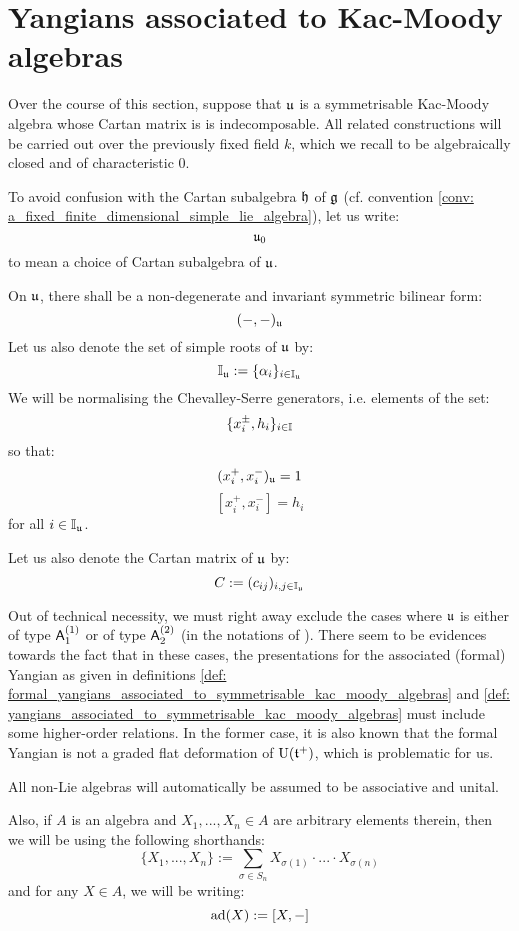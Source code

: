 \section{Yangians associated to Kac-Moody algebras}
    \begin{convention} \label{conv: a_fixed_symmetrisable_kac_moody_algebra}
        Over the course of this section, suppose that $\mathfrak{u}$ is a symmetrisable Kac-Moody algebra whose Cartan matrix is is indecomposable. All related constructions will be carried out over the previously fixed field $k$, which we recall to be algebraically closed and of characteristic $0$. 

        To avoid confusion with the Cartan subalgebra $\mathfrak{h}$ of $\mathfrak{g}$ (cf. convention \ref{conv: a_fixed_finite_dimensional_simple_lie_algebra}), let us write:
            $$\mathfrak{u}_0$$
        to mean a choice of Cartan subalgebra of $\mathfrak{u}$. 
        
        On $\mathfrak{u}$, there shall be a non-degenerate and invariant symmetric bilinear form:
            $$(-, -)_{\mathfrak{u}}$$
        Let us also denote the set of simple roots of $\mathfrak{u}$ by:
            $$\mathbb{I}_{\mathfrak{u}} := \{\alpha_i\}_{i \in \mathbb{I}_{\mathfrak{u}}}$$
        We will be normalising the Chevalley-Serre generators, i.e. elements of the set:
            $$\{x_i^{\pm}, h_i\}_{i \in \mathbb{I}}$$
        so that:
            $$(x_i^+, x_i^-)_{\mathfrak{u}} = 1$$
            $$[x_i^+, x_i^-] = h_i$$
        for all $i \in \mathbb{I}_{\mathfrak{u}}$.

        Let us also denote the Cartan matrix of $\mathfrak{u}$ by:
            $$C := (c_{ij})_{i, j \in \mathbb{I}_{\mathfrak{u}}}$$
    \end{convention}
    Out of technical necessity, we must right away exclude the cases where $\mathfrak{u}$ is either of type $\mathsf{A}_1^{(1)}$ or of type $\mathsf{A}_2^{(2)}$ (in the notations of \cite[Chapter 4]{kac_infinite_dimensional_lie_algebras}). There seem to be evidences towards the fact that in these cases, the presentations for the associated (formal) Yangian as given in definitions \ref{def: formal_yangians_associated_to_symmetrisable_kac_moody_algebras} and \ref{def: yangians_associated_to_symmetrisable_kac_moody_algebras} must include some higher-order relations. In the former case, it is also known that the formal Yangian is not a graded flat deformation of $\mathrm{U}(\mathfrak{t}^{+})$, which is problematic for us.

    \begin{convention}
        All non-Lie algebras will automatically be assumed to be associative and unital. 

        Also, if $A$ is an algebra and $X_1, ..., X_n \in A$ are arbitrary elements therein, then we will be using the following shorthands:
            $$\{ X_1, ..., X_n \} := \sum_{\sigma \in S_n} X_{\sigma(1)} \cdot ... \cdot X_{\sigma(n)}$$
        and for any $X \in A$, we will be writing:
            $$\mathrm{ad}(X) := [X, -]$$
    \end{convention}

